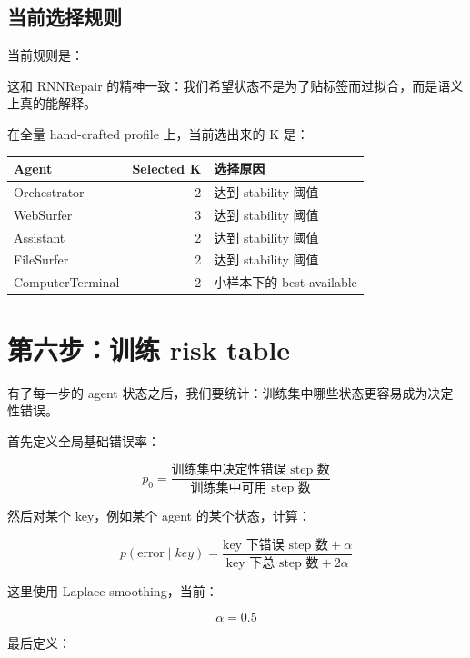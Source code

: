 \documentclass[UTF8,a4paper,11pt]{ctexart}
\begin{document}
\subsection{当前选择规则}

当前规则是：

\begin{center}
\end{center}

这和 RNNRepair 的精神一致：我们希望状态不是为了贴标签而过拟合，而是语义上真的能解释。

在全量 hand-crafted profile 上，当前选出来的 K 是：

\begin{table}[htbp]
\centering
\begin{tabular}{lrl}
\toprule
Agent & Selected K & 选择原因 \\
\midrule
Orchestrator & 2 & 达到 stability 阈值 \\
WebSurfer & 3 & 达到 stability 阈值 \\
Assistant & 2 & 达到 stability 阈值 \\
FileSurfer & 2 & 达到 stability 阈值 \\
ComputerTerminal & 2 & 小样本下的 best available \\
\bottomrule
\end{tabular}
\end{table}

\section{第六步：训练 risk table}

有了每一步的 agent 状态之后，我们要统计：训练集中哪些状态更容易成为决定性错误。

首先定义全局基础错误率：

\[
p_0 = \frac{\text{训练集中决定性错误 step 数}}{\text{训练集中可用 step 数}}
\]

然后对某个 key，例如某个 agent 的某个状态，计算：

\[
p(\text{error}\mid key)
=
\frac{\text{key 下错误 step 数}+\alpha}
{\text{key 下总 step 数}+2\alpha}
\]

这里使用 Laplace smoothing，当前：

\[
\alpha = 0.5
\]

最后定义：
\end{document}
